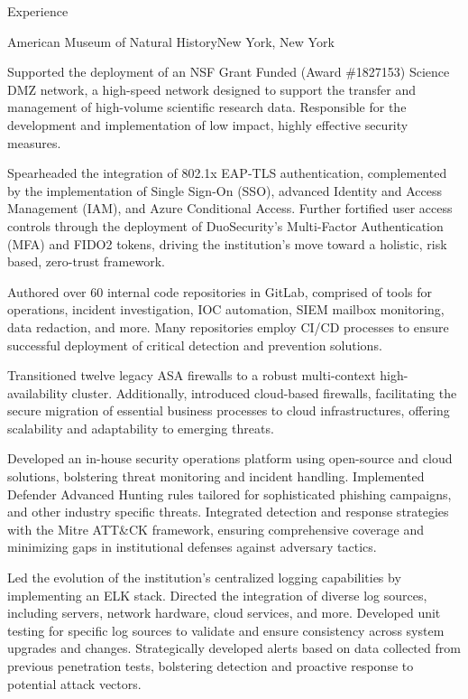 \documentclass[]{mcdowellcv}
\begin{document}
\begin{cvsection}{Experience}
\begin{jobentry}{American Museum of Natural History}{New York, New York}
        \begin{jobprojects}
            \item Supported the deployment of an NSF Grant Funded (Award \#1827153) Science DMZ network, a high-speed network designed to support the transfer and management of high-volume scientific research data. Responsible for the development and implementation of low impact, highly effective security measures.
            \item Spearheaded the integration of 802.1x EAP-TLS authentication, complemented by the implementation of Single Sign-On (SSO), advanced Identity and Access Management (IAM), and Azure Conditional Access. Further fortified user access controls through the deployment of DuoSecurity's Multi-Factor Authentication (MFA) and FIDO2 tokens, driving the institution's move toward a holistic, risk based, zero-trust framework.
            \item Authored over 60 internal code repositories in GitLab, comprised of tools for operations, incident investigation, IOC automation, SIEM mailbox monitoring, data redaction, and more. Many repositories employ CI/CD processes to ensure successful deployment of critical detection and prevention solutions.
            \item Transitioned twelve legacy ASA firewalls to a robust multi-context high-availability cluster. Additionally, introduced cloud-based firewalls, facilitating the secure migration of essential business processes to cloud infrastructures, offering scalability and adaptability to emerging threats.
            \item Developed an in-house security operations platform using open-source and cloud solutions, bolstering threat monitoring and incident handling. Implemented Defender Advanced Hunting rules tailored for sophisticated phishing campaigns, and other industry specific threats. Integrated detection and response strategies with the Mitre ATT\&CK framework, ensuring comprehensive coverage and minimizing gaps in institutional defenses against adversary tactics.
            \item Led the evolution of the institution's centralized logging capabilities by implementing an ELK stack. Directed the integration of diverse log sources, including servers, network hardware, cloud services, and more. Developed unit testing for specific log sources to validate and ensure consistency across system upgrades and changes. Strategically developed alerts based on data collected from previous penetration tests, bolstering detection and proactive response to potential attack vectors.

\end{jobprojects}
\end{jobentry}
\end{cvsection}
\end{document}
